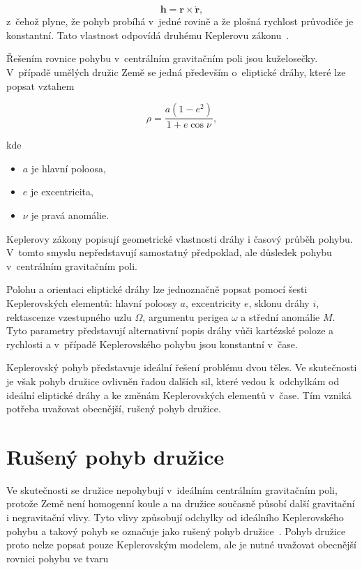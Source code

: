 \begin{equation}
\mathbf h = \mathbf r \times \dot{\mathbf r},
\end{equation}
z~čehož plyne, že pohyb probíhá v~jedné rovině a že plošná rychlost průvodiče je konstantní. Tato vlastnost odpovídá druhému Keplerovu zákonu~\cite{bursa_kostelecky_1994}.

Řešením rovnice pohybu v~centrálním gravitačním poli jsou kuželosečky. V~případě umělých družic Země se jedná především o~eliptické dráhy, které lze popsat vztahem

\begin{equation}
\rho = \frac{a(1 - e^2)}{1 + e \cos \nu},
\end{equation}

kde 
\begin{itemize}
    \item $a$ je hlavní poloosa, 
    \item $e$ je excentricita,
    \item $\nu$ je pravá anomálie.
\end{itemize}

Keplerovy zákony popisují geometrické vlastnosti dráhy i časový průběh pohybu. V~tomto smyslu nepředstavují samostatný předpoklad, ale důsledek pohybu v~centrálním gravitačním poli.

Polohu a orientaci eliptické dráhy lze jednoznačně popsat pomocí šesti Keplerovských elementů: hlavní poloosy $a$, excentricity $e$, sklonu dráhy $i$, rektascenze vzestupného uzlu $\Omega$, argumentu perigea $\omega$ a střední anomálie $M$. Tyto parametry představují alternativní popis dráhy vůči kartézské poloze a rychlosti a v~případě Keplerovského pohybu jsou konstantní v~čase.

Keplerovský pohyb představuje ideální řešení problému dvou těles. Ve skutečnosti je však pohyb družice ovlivněn řadou dalších sil, které vedou k~odchylkám od ideální eliptické dráhy a ke změnám Keplerovských elementů v~čase. Tím vzniká potřeba uvažovat obecnější, rušený pohyb družice.

\section{Rušený pohyb družice}

Ve skutečnosti se družice nepohybují v~ideálním centrálním gravitačním poli, protože Země není homogenní koule a na družice současně působí další gravitační i negravi\-tační vlivy. Tyto vlivy způsobují odchylky od ideálního Keplerovského pohybu a takový pohyb se označuje jako rušený pohyb družice~\cite{bursa_kostelecky_1994}. Pohyb družice proto nelze popsat pouze Keplerovským modelem, ale je nutné uvažovat obecnější rovnici pohybu ve tvaru

